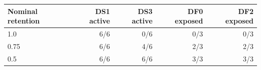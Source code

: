 \begin{tabular}{lrrrr}
\toprule
Nominal retention & DS1 active & DS3 active & DF0 exposed & DF2 exposed\\\midrule
1.0 & 6/6 & 0/6 & 0/3 & 0/3 \\
0.75 & 6/6 & 4/6 & 2/3 & 2/3 \\
0.5 & 6/6 & 6/6 & 3/3 & 3/3 \\
\bottomrule
\end{tabular}
